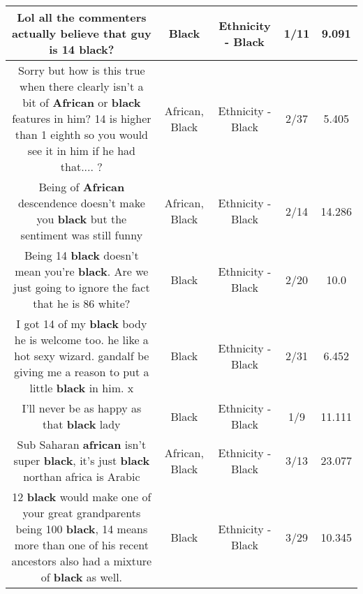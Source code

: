 \documentclass[11pt]{article}
\newlength\mylength
\begin{document}
\begin{center}
\begin{longtable}{|C{.65\mylength}|C{.30\mylength}|C{.12\mylength}|C{.12\mylength}|C{.12\mylength}|}
  \small Lol all the commenters actually believe that guy is 14 \textbf{black}?\normalsize   & Black & Ethnicity - Black & 1/11 & 9.091 \\  \hline
  \small Sorry but how is this true when there clearly isn't a bit of \textbf{African} or \textbf{black} features in him? 14 is higher than 1 eighth so you would see it in him if he had that.... ?\normalsize   & African, Black & Ethnicity - Black & 2/37 & 5.405 \\  \hline
  \small Being of \textbf{African} descendence doesn't make you \textbf{black} but the sentiment was still funny\normalsize   & African, Black & Ethnicity - Black & 2/14 & 14.286 \\  \hline
  \small Being 14 \textbf{black} doesn't mean you're \textbf{black}. Are we just going to ignore the fact that he is 86 white?\normalsize   & Black & Ethnicity - Black & 2/20 & 10.0 \\  \hline
  \small I got 14 of my \textbf{black} body he is welcome too. he like a hot sexy wizard. gandalf be giving me a reason to put a little \textbf{black} in him. x\normalsize   & Black & Ethnicity - Black & 2/31 & 6.452 \\  \hline
  \small I'll never be as happy as that \textbf{black} lady\normalsize   & Black & Ethnicity - Black & 1/9 & 11.111 \\  \hline
  \small Sub Saharan \textbf{african} isn't super \textbf{black}, it's just \textbf{black} northan africa is Arabic\normalsize   & African, Black & Ethnicity - Black & 3/13 & 23.077 \\  \hline
  \small 12 \textbf{black} would make one of your great grandparents being 100 \textbf{black}, 14 means more than one of his recent ancestors also had a mixture of \textbf{black} as well.\normalsize   & Black & Ethnicity - Black & 3/29 & 10.345 \\  \hline

\end{longtable}
\end{center}
\end{document}
